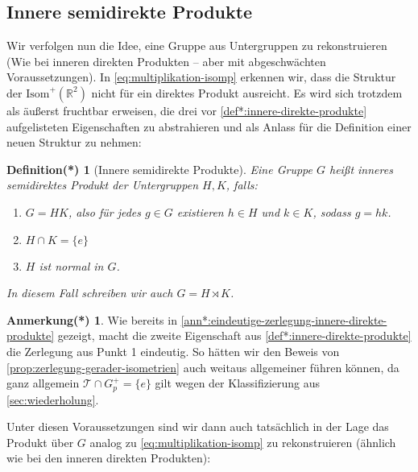 \documentclass[a4paper, ngerman]{article}
\newcounter{chapter}
\numberwithin{equation}{chapter}
\theoremstyle{plain}
\newtheorem{definitionstrd}{Definition(*)}[chapter]
\theoremstyle{definition}
\newtheorem{annotationstrd}{Anmerkung(*)}[chapter]
\newcommand{\anm}[1]{{\color{red} #1}}
\begin{document}
\subsection{Innere semidirekte Produkte}\label{subsec:innere-semidirekte-produkte}
Wir verfolgen nun die Idee, eine Gruppe aus Untergruppen zu rekonstruieren (Wie bei inneren direkten Produkten -- aber mit abgeschwächten Voraussetzungen). In \eqref{eq:multiplikation-isomp} erkennen wir, dass die Struktur der \(\mathrm{Isom}^+(\mathbb R^2)\) nicht für ein direktes Produkt ausreicht. Es wird sich trotzdem als äußerst fruchtbar erweisen, die drei vor \cref{def*:innere-direkte-produkte} aufgelisteten Eigenschaften zu abstrahieren und als Anlass für die Definition einer neuen Struktur zu nehmen:

\begin{definitionstrd}[Innere semidirekte Produkte]\label{def*:innere-semidirekte-produkte}
    Eine Gruppe \(G\) heißt \emph{inneres semidirektes Produkt} der Untergruppen \(H, K\), falls: 
    \begin{enumerate}
        \item \(G = HK\), also für jedes \(g \in G\) existieren \(h \in H\) und \(k \in K\), sodass \(g = hk\). %
        \item \(H\cap K = \{e\}\) %
    
        \item \(H\) ist normal in \(G\). 
    \end{enumerate}
    In diesem Fall schreiben wir auch \(G = H \rtimes K\). 
\end{definitionstrd}
\begin{annotationstrd}
    Wie bereits in \cref{ann*:eindeutige-zerlegung-innere-direkte-produkte} gezeigt, macht die zweite Eigenschaft aus \cref{def*:innere-direkte-produkte} die Zerlegung aus Punkt 1 eindeutig. So hätten wir den Beweis von \cref{prop:zerlegung-gerader-isometrien} auch weitaus allgemeiner führen können, da ganz allgemein \(\mathcal T \cap G_p^+ = \{e\}\) gilt wegen der Klassifizierung aus \cref{sec:wiederholung}.  
\end{annotationstrd}
Unter diesen Voraussetzungen sind wir dann auch tatsächlich in der Lage das Produkt über \(G\) analog zu \eqref{eq:multiplikation-isomp} zu rekonstruieren (ähnlich wie bei den inneren direkten Produkten): 
\end{document}
